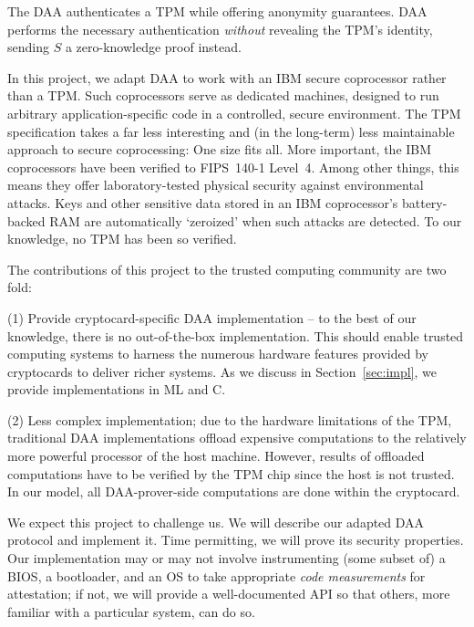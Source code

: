 The DAA authenticates a TPM
while offering anonymity guarantees.
DAA performs the necessary authentication \emph{without} revealing the TPM's identity,
sending $S$ a zero-knowledge proof instead. 

In this project, we adapt DAA to work with an IBM secure coprocessor
rather than a TPM.
Such coprocessors serve as dedicated machines, 
designed to run arbitrary application-specific
code in a controlled, secure environment.
The TPM specification takes a far less
interesting and (in the long-term) less maintainable approach to
secure coprocessing: One size fits all.
More important, the IBM coprocessors have been verified to FIPS~140-1 Level~4.
Among other things, this means they offer laboratory-tested physical security against
environmental attacks.
Keys and other sensitive data stored in an IBM coprocessor's battery-backed RAM
are automatically `zeroized' when such attacks are detected.
To our knowledge, no TPM has been so verified.

The contributions of this project to the trusted computing community are two fold:

(1) Provide cryptocard-specific DAA implementation -- to the best of our knowledge, there is no out-of-the-box implementation. This should enable trusted computing systems to harness the numerous hardware features provided by cryptocards to deliver richer systems. As we discuss in Section~\ref{sec:impl}, we provide implementations in ML and C.

(2) Less complex implementation;  due to the hardware limitations of the TPM, traditional DAA implementations offload expensive computations to the relatively more powerful processor of the host machine. However, results of offloaded computations have to be verified by the TPM chip since the host is not trusted. In our model, all DAA-prover-side computations are done within the cryptocard.

We expect this project to challenge us.
We will describe our adapted DAA protocol and implement it.
Time permitting, we will prove its security properties.
Our implementation may or may not involve instrumenting (some subset of)
a BIOS, a bootloader, and an OS to take appropriate \emph{code measurements} for attestation;
if not, we will provide a well-documented API so that others,
more familiar with a particular system, can do so.

